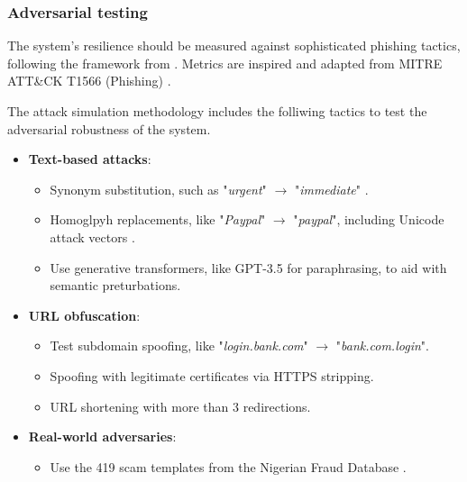
\subsubsection*{Adversarial testing}
The system's resilience should be measured against sophisticated phishing tactics, following the framework from \citep{kapoor2024comparative}. Metrics are inspired and adapted from MITRE ATT\&CK\textsuperscript{\textsuperscript{\textregistered}} T1566 (Phishing) \citep{mitre2020phishing}.\newline

\noindent The attack simulation methodology includes the folliwing tactics to test the adversarial robustness of the system.

\begin{itemize}
  \item \textbf{Text-based attacks}:
  \begin{itemize}
    \item Synonym substitution, such as "\textit{urgent}" $\rightarrow$ "\textit{immediate}" \citep{andriu2023adaptive}.
    \item Homoglpyh replacements, like "\textit{Paypal}" $\rightarrow$ "\textit{paypal}", including Unicode attack vectors \citep{greco2023explaining}.
    \item Use generative transformers, like GPT-3.5 for paraphrasing, to aid with semantic preturbations.
  \end{itemize}
  \item \textbf{URL obfuscation}:
  \begin{itemize}
    \item Test subdomain spoofing, like "\textit{login.bank.com}" $\rightarrow$ "\textit{bank.com.login}".
    \item Spoofing with legitimate certificates via HTTPS stripping.
    \item URL shortening with more than 3 redirections.
  \end{itemize}
  \item \textbf{Real-world adversaries}:
  \begin{itemize}
    \item Use the 419 scam templates from the Nigerian Fraud Database \citep{champa2024phishing}.
  \end{itemize}
\end{itemize}


